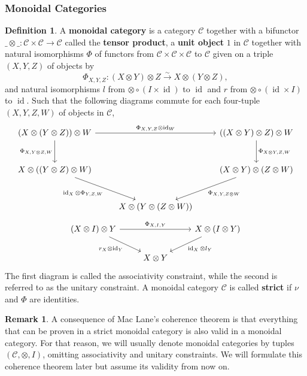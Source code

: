\documentclass{article}
\theoremstyle{plain}
\theoremstyle{definition}
\newtheorem{definition}[theorem]{Definition}
\newtheorem{remark}{Remark}
\DeclareMathOperator{\id}{id}
\begin{document}
\subsubsection{Monoidal Categories}

\begin{definition}
    A \textbf{monoidal category} is 
    a category $\mathcal{C}$ together with 
    a bifunctor $\_\otimes\_:\mathcal{C}\times \mathcal{C}\rightarrow \mathcal{C}$ called the \textbf{tensor product}, 
    a \textbf{unit object} $1$ in $\mathcal{C}$ together with natural isomorphisms $\Phi$ of functors from $\mathcal{C}\times\mathcal{C}\times\mathcal{C}$ to $\mathcal{C}$ given on a triple $(X,Y,Z)$ of objects by 
    $$\Phi_{X,Y,Z} : (X\otimes Y)\otimes Z \xrightarrow{\sim} X\otimes (Y\otimes Z),$$
    and natural isomorphisms $l$ from $\otimes\circ (I\times \id)$ to $\id$ 
    and $r$ from $\otimes \circ (\id\times I)$ to $\id$.
    Such that the following diagrams commute for each four-tuple $(X,Y,Z,W)$ of objects in $\mathcal{C}$,
    \[
    \begin{tikzcd}[row sep = large]
        (X\otimes (Y\otimes Z)) \otimes W 
        \arrow[rr, "\Phi_{X,Y,Z}\otimes\id_W"] \arrow[d,"\Phi_{X,Y\otimes Z,W}"'] && ((X\otimes Y) \otimes Z) \otimes W \arrow[d,"\Phi_{X\otimes Y, Z, W}"]\\
        X\otimes ((Y\otimes Z)\otimes W)
        \arrow[dr, "\id_X\otimes \Phi_{Y,Z,W}"'] && (X\otimes Y)\otimes (Z\otimes W)
        \arrow[dl, "\Phi_{X,Y, Z\otimes W}"]\\
        & X\otimes (Y\otimes (Z\otimes W))
    \end{tikzcd}
    \]
    \[
    \begin{tikzcd}
        (X\otimes I)\otimes Y 
        \arrow[rr,"\Phi_{X,I,Y}"]
        \arrow[dr,"r_X\otimes \id_Y"']&&
        X\otimes (I\otimes Y)
        \arrow[dl,"\id_X\otimes l_Y"]\\
        & X\otimes Y
    \end{tikzcd}
    \]
    The first diagram is called the associativity constraint, while the second is referred to as the unitary constraint.
    A monoidal category $\mathcal{C}$ is called \textbf{strict} if $\nu$ and $\Phi$ are identities.
\end{definition}

\begin{remark}
    A consequence of Mac Lane's coherence theorem is that everything that can be proven in a strict monoidal category is also valid in a monoidal category. 
    For that reason, we will usually denote monoidal categories by tuples $(\mathcal{C},\otimes, I)$, omitting associativity and unitary constraints.
    We will formulate this coherence theorem later but assume its validity from now on.
\end{remark}
\end{document}
